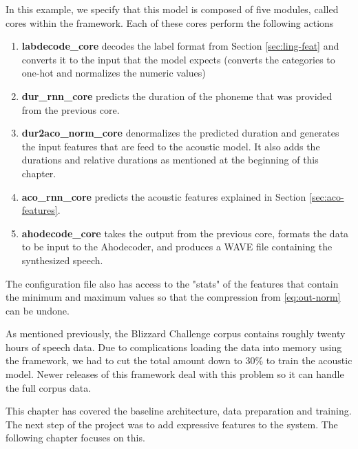 In this example, we specify that this model is composed of five modules, called cores within the framework. Each of these cores perform the following actions

\begin{enumerate}
    \item \textbf{labdecode\_core} decodes the label format from Section \ref{sec:ling-feat} and converts it to the input that the model expects (converts the categories to one-hot and normalizes the numeric values)
    \item \textbf{dur\_rnn\_core} predicts the duration of the phoneme that was provided from the previous core.
    \item \textbf{dur2aco\_norm\_core} denormalizes the predicted duration and generates the input features that are feed to the acoustic model. It also adds the durations and relative durations as mentioned at the beginning of this chapter.
    \item \textbf{aco\_rnn\_core} predicts the acoustic features explained in Section \ref{sec:aco-features}.
    \item \textbf{ahodecode\_core} takes the output from the previous core, formats the data to be input to the Ahodecoder, and produces a WAVE file containing the synthesized speech.
\end{enumerate}

The configuration file also has access to the "stats" of the features that contain the minimum and maximum values so that the compression from \ref{eq:out-norm} can be undone.

As mentioned previously, the Blizzard Challenge corpus contains roughly twenty hours of speech data. Due to complications loading the data into memory using the framework, we had to cut the total amount down to 30\% to train the acoustic model. Newer releases of this framework deal with this problem so it can handle the full corpus data.

This chapter has covered the baseline architecture, data preparation and training. The next step of the project was to add expressive features to the system. The following chapter focuses on this.

